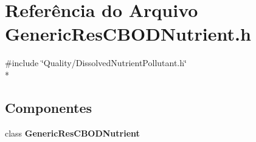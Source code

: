 \section{Referência do Arquivo Generic\+Res\+C\+B\+O\+D\+Nutrient.\+h}
\label{_generic_res_c_b_o_d_nutrient_8h}
{\ttfamily \#include \char`\"{}Quality/\+Dissolved\+Nutrient\+Pollutant.\+h\char`\"{}}\\*
\subsection*{Componentes}
\begin{DoxyCompactItemize}
\item 
class {\bf Generic\+Res\+C\+B\+O\+D\+Nutrient}
\end{DoxyCompactItemize}
